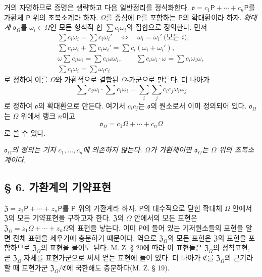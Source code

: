거의 자명하므로 증명은 생략하고 다음 일반정리를 정식화한다. \(\mathfrak{o}=c_1\mathsf P+\cdots+c_n\mathsf P\)를 가환체 \(\mathsf P\) 위의 초복소계라 하자. \(\Omega\)를 중심에 \(\mathsf P\)를 포함하는 \(\mathsf P\)의 확대환이라 하자. \emph{확대계} \(\mathfrak{o}_\Omega\)를 \(\omega_i\in\Omega\)인 모든 형식적 합 \(\sum c_i\omega_i\)의 집합으로 정의한다. 먼저
\[
\begin{array}{l}
\displaystyle
\sum c_i\omega_i=\sum c_i\omega_i'
\quad\Longleftrightarrow\quad
\omega_i=\omega_i'\ \text{(모든 \(i\))},\\[0.4em]
\displaystyle
\sum c_i\omega_i+\sum c_i\omega_i'
=\sum c_i(\omega_i+\omega_i'),\\[0.4em]
\displaystyle
\omega\sum c_i\omega_i=\sum c_i\omega\omega_i,
\qquad
\sum c_i\omega_i\cdot\omega=\sum c_i\omega_i\omega,\\[0.4em]
\displaystyle
\sum c_i\omega_i=\sum\omega_i c_i
\end{array}
\]
로 정하여 이를 \(\Omega\)와 가환적으로 결합된 \(\Omega\)-가군으로 만든다. 더 나아가
\[
        \sum c_i\omega_i\cdot\sum c_i\omega_i
        =\sum_i\sum_jc_ic_j\omega_i\omega_j
\]
로 정하여 \(\mathfrak{o}\)의 확대환으로 만든다. 여기서 \(c_ic_j\)는 \(\mathfrak{o}\)의 원소로서 이미 정의되어 있다. \(\mathfrak{o}_\Omega\)는 \(\Omega\) 위에서 랭크 \(n\)이고
\[
        \mathfrak{o}_\Omega
        =c_1\Omega+\cdots+c_n\Omega
\]
로 쓸 수 있다.

\emph{\(\mathfrak{o}_\Omega\)의 정의는 기저 \(c_1,\ldots,c_n\)에 의존하지 않는다. \(\Omega\)가 가환체이면 \(\mathfrak{o}_\Omega\)는 \(\Omega\) 위의 초복소계이다.}

\subsection*{§ 6. 가환계의 기약표현}

\(\mathfrak Z=z_1\mathsf P+\cdots+z_n\mathsf P\)를 \(\mathsf P\) 위의 가환계라 하자. \(\mathsf P\)의 대수적으로 닫힌 확대체 \(\Omega\) 안에서 \(\mathfrak Z\)의 모든 기약표현을 구하고자 한다. \(\mathfrak Z\)의 \(\Omega\) 안에서의 모든 표현은 \(\mathfrak Z_\Omega=z_1\Omega+\cdots+z_n\Omega\)의 표현을 낳는다. 이미 \(\mathsf P\)에 들어 있는 기저원소들의 표현을 알면 전체 표현을 세우기에 충분하기 때문이다. 역으로 \(\mathfrak Z_\Omega\)의 모든 표현은 \(\mathfrak Z\)의 표현을 포함하므로 \(\mathfrak Z_\Omega\)의 표현을 물어도 된다. M. Z. § 20에 따라 이 표현들은 \(\mathfrak Z_\Omega\)의 정칙표현, 곧 \(\mathfrak Z_\Omega\) 자체를 표현가군으로 써서 얻는 표현에 들어 있다. 더 나아가 \(\mathfrak C\)를 \(\mathfrak Z_\Omega\)의 근기라 할 때 표현가군 \(\mathfrak Z_\Omega/\mathfrak C\)에 국한해도 충분하다(M. Z. § 19).

